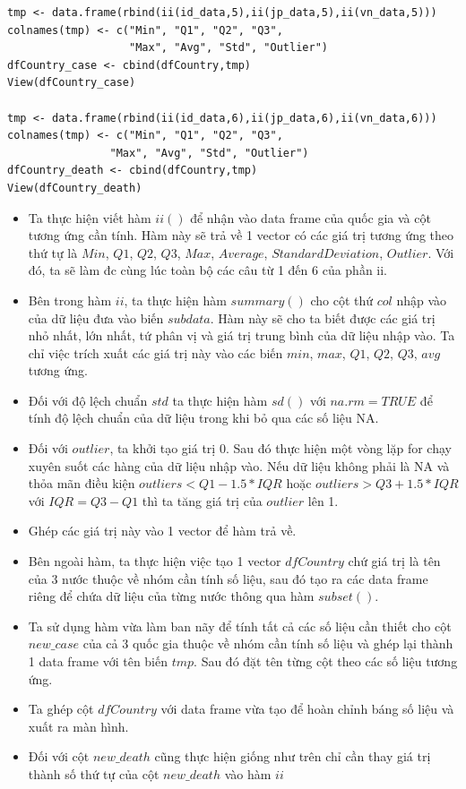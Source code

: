 \documentclass[a4paper]{article}
\theoremstyle{definition}
\begin{document}
\begin{enumerate}[i)]
\begin{enumerate}[1)]
\begin{lstlisting}[frame=single]
tmp <- data.frame(rbind(ii(id_data,5),ii(jp_data,5),ii(vn_data,5)))
colnames(tmp) <- c("Min", "Q1", "Q2", "Q3",
                   "Max", "Avg", "Std", "Outlier")
dfCountry_case <- cbind(dfCountry,tmp)
View(dfCountry_case)

tmp <- data.frame(rbind(ii(id_data,6),ii(jp_data,6),ii(vn_data,6)))
colnames(tmp) <- c("Min", "Q1", "Q2", "Q3", 
                "Max", "Avg", "Std", "Outlier")
dfCountry_death <- cbind(dfCountry,tmp)
View(dfCountry_death)
	\end{lstlisting}
\begin{itemize}
    \item Ta thực hiện viết hàm $ii()$ để nhận vào data frame của quốc gia và cột tương ứng cần tính. Hàm này sẽ trả về 1 vector có các giá trị tương ứng theo thứ tự là $Min$, $Q1$, $Q2$, $Q3$, $Max$, $Average$, $StandardDeviation$, $Outlier$. Với đó, ta sẽ làm đc cùng lúc toàn bộ các câu từ 1 đến 6 của phần ii.
    \item Bên trong hàm $ii$, ta thực hiện hàm $summary()$ cho cột thứ $col$ nhập vào của dữ liệu đưa vào biến $subdata$. Hàm này sẽ cho ta biết được các giá trị nhỏ nhất, lớn nhất, tứ phân vị và giá trị trung bình của dữ liệu nhập vào. Ta chỉ việc trích xuất các giá trị này vào các biến $min$, $max$, $Q1$, $Q2$, $Q3$, $avg$ tương ứng.
    \item Đối với độ lệch chuẩn $std$ ta thực hiện hàm $sd()$ với $na.rm = TRUE$ để tính độ lệch chuẩn của dữ liệu trong khi bỏ qua các số liệu NA.
    \item Đối với $outlier$, ta khởi tạo giá trị 0. Sau đó thực hiện một vòng lặp for chạy xuyên suốt các hàng của dữ liệu nhập vào. Nếu dữ liệu không phải là NA và thỏa mãn điều kiện $outliers < Q1 - 1.5*IQR$ hoặc $outliers > Q3 + 1.5*IQR$ với $IQR = Q3 - Q1$ thì ta tăng giá trị của $outlier$ lên 1.
    \item Ghép các giá trị này vào 1 vector để hàm trả về.
    \item Bên ngoài hàm, ta thực hiện việc tạo 1 vector $dfCountry$ chứ giá trị là tên của 3 nước thuộc về nhóm cần tính số liệu, sau đó tạo ra các data frame riêng để chứa dữ liệu của từng nước thông qua hàm $subset()$.
    \item Ta sử dụng hàm vừa làm ban nãy để tính tất cả các số liệu cần thiết cho cột $new\_case$ của cả 3 quốc gia thuộc về nhóm cần tính số liệu và ghép lại thành 1 data frame với tên biến $tmp$. Sau đó đặt tên từng cột theo các số liệu tương ứng.
    \item Ta ghép cột $dfCountry$ với data frame vừa tạo để hoàn chỉnh báng số liệu và xuất ra màn hình.
    \item Đối với cột $new\_death$ cũng thực hiện giống như trên chỉ cần thay giá trị thành số thứ tự của cột $new\_death$ vào hàm $ii$
\end{itemize}


\end{enumerate}
\end{enumerate}
\end{document}
